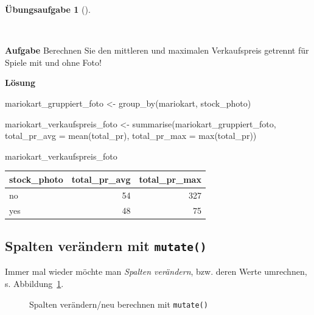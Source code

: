 \documentclass[
  letterpaper,
]{scrbook}
\newenvironment{Shaded}{\begin{snugshade}}{\end{snugshade}}
\newcommand{\AttributeTok}[1]{\textcolor[rgb]{0.40,0.45,0.13}{#1}}
\newcommand{\FunctionTok}[1]{\textcolor[rgb]{0.28,0.35,0.67}{#1}}
\newcommand{\NormalTok}[1]{\textcolor[rgb]{0.00,0.23,0.31}{#1}}
\newcommand{\OtherTok}[1]{\textcolor[rgb]{0.00,0.23,0.31}{#1}}
\theoremstyle{definition}
\newtheorem{exercise}{Übungsaufgabe}[chapter]
\theoremstyle{definition}
\theoremstyle{definition}
\theoremstyle{remark}
\begin{document}
\begin{exercise}[]\protect\hypertarget{exr-groupby}{}\label{exr-groupby}

~

\textbf{Aufgabe} Berechnen Sie den mittleren und maximalen Verkaufspreis
getrennt für Spiele mit und ohne Foto!

\textbf{Lösung}

\begin{Shaded}
\begin{Highlighting}[]
\NormalTok{mariokart\_gruppiert\_foto }\OtherTok{\textless{}{-}} \FunctionTok{group\_by}\NormalTok{(mariokart, stock\_photo)}

\NormalTok{mariokart\_verkaufspreis\_foto }\OtherTok{\textless{}{-}} 
  \FunctionTok{summarise}\NormalTok{(mariokart\_gruppiert\_foto,}
            \AttributeTok{total\_pr\_avg =} \FunctionTok{mean}\NormalTok{(total\_pr),}
            \AttributeTok{total\_pr\_max =} \FunctionTok{max}\NormalTok{(total\_pr))}

\NormalTok{mariokart\_verkaufspreis\_foto}
\end{Highlighting}
\end{Shaded}

\begin{longtable}[]{@{}lrr@{}}
\toprule\noalign{}
stock\_photo & total\_pr\_avg & total\_pr\_max \\
\midrule\noalign{}
\endhead
\bottomrule\noalign{}
\endlastfoot
no & 54 & 327 \\
yes & 48 & 75 \\
\end{longtable}

\end{exercise}

\subsection{\texorpdfstring{Spalten verändern mit
\texttt{mutate()}}{Spalten verändern mit mutate()}}\label{spalten-veruxe4ndern-mit-mutate}

Immer mal wieder möchte man \emph{Spalten verändern}, bzw. deren Werte
umrechnen, s. Abbildung~\ref{fig-mutate}.

\begin{figure}


\caption{\label{fig-mutate}Spalten verändern/neu berechnen mit
\texttt{mutate()}}

\end{figure}%
\end{document}
